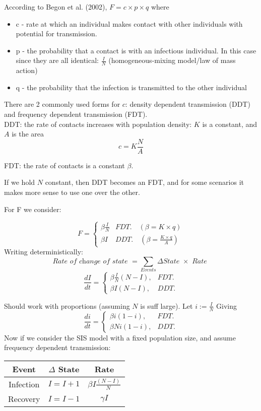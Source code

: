 \documentclass{X:/Documents/Coding/Latex/myassignment}
\begin{document}
According to Begon et al. (2002), $F = c\times p \times q$ where 
\begin{itemize}
    \item c - rate at which an individual makes contact with other individuals with potential for transmission. 
    \item p - the probability that a contact is with an infectious individual. In this case since they are all identical: $\frac{I}{N}$ (homogeneous-mixing model/law of mass action)
    \item q - the probability that the infection is transmitted to the other individual
\end{itemize}
There are 2 commonly used forms for $c$: density dependent transmission (DDT) and frequency dependent transmission (FDT).\\
DDT: the rate of contacts increases with population density: $K$ is a constant, and $A$ is the area
\[c = K\frac{N}{A}\]

FDT: the rate of contacts is a constant $\beta$.

If we hold $N$ constant, then DDT becomes an FDT, and for some scenarios it makes more sense to use one over the other.

For F we consider:

\[F= \begin{cases}
\beta \frac{I}{N}&FDT. \quad (\beta = K\times q)\\
\beta I& DDT.\quad (\beta = \frac{K\times q}{A})
\end{cases}\]
Writing deterministically:\
\[\textit{Rate of change of state }= \sum_{Events}\Delta\textit{State }\times \textit{ Rate }\] 
\[\frac{dI}{dt} = \begin{cases}
\beta \frac{I}{N}(N-I),&FDT.\\
\beta I(N-I),&DDT.
\end{cases}\]

Should work with proportions (assuming $N$ is suff large).
Let $i := \frac IN$
Giving
\[\frac{di}{dt} = \begin{cases}
\beta i(1-i),&FDT.\\
\beta Ni(1-i),&DDT.
\end{cases}\]
\newpage
Now if we consider the SIS model with a fixed population size, and assume frequency dependent transmission:
\begin{table}[h]
    \centering
    \begin{tabular}{c|c|c}
         Event&$\Delta$ State&Rate \\
         \hline
         Infection&$I=I+1$&$\beta I\frac{(N-I)}{N}$\\
         Recovery &$I=I-1$&$\gamma I$
    \end{tabular}
\end{table}
\end{document}

